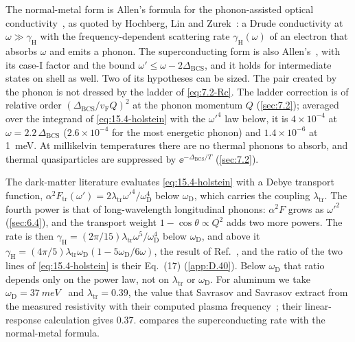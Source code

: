 \noindent The normal-metal form is Allen's formula for the phonon-assisted optical conductivity~\cite{allen1971electron}, as quoted by Hochberg, Lin and Zurek~\cite[Eqs.~(13), (16)]{hochberg2016absorption}: a Drude conductivity at $\omega \gg \gamma_{\mathrm{H}}$ with the frequency-dependent scattering rate $\gamma_{\mathrm{H}}(\omega)$ of an electron that absorbs $\omega$ and emits a phonon. The superconducting form is also Allen's~\cite[Eq.~(17)]{hochberg2016absorption}, with its case-I factor and the bound $\omega' \le \omega - 2\Delta_{\mathrm{BCS}}$, and it holds for intermediate states on shell as well. Two of its hypotheses can be sized. The pair created by the phonon is not dressed by the ladder of \cref{eq:7.2-Rc}. The ladder correction is of relative order $(\Delta_{\mathrm{BCS}}/v_{\mathrm{F}}Q)^2$ at the phonon momentum $Q$ (\cref{sec:7.2}); averaged over the integrand of \cref{eq:15.4-holstein} with the $\omega'^4$ law below, it is $4\times10^{-4}$ at $\omega = 2.2\,\Delta_{\mathrm{BCS}}$ ($2.6\times10^{-4}$ for the most energetic phonon) and $1.4\times10^{-6}$ at \SI{1}{meV}. At millikelvin temperatures there are no thermal phonons to absorb, and thermal quasiparticles are suppressed by $\ee^{-\Delta_{\mathrm{BCS}}/T}$ (\cref{sec:7.2}).

The dark-matter literature evaluates \cref{eq:15.4-holstein} with a Debye transport function, $\alpha^2F_{\mathrm{tr}}(\omega') = 2\lambda_{\mathrm{tr}}\omega'^4/\omega_{\mathrm{D}}^4$ below $\omega_{\mathrm{D}}$, which carries the coupling $\lambda_{\mathrm{tr}}$. The fourth power is that of long-wavelength longitudinal phonons: $\alpha^2F$ grows as $\omega'^2$ (\cref{sec:6.4}), and the transport weight $1 - \cos\theta \propto Q^2$ adds two more powers. The rate is then $\gamma_{\mathrm{H}} = (2\pi/15)\lambda_{\mathrm{tr}}\omega^5/\omega_{\mathrm{D}}^4$ below $\omega_{\mathrm{D}}$, and above it $\gamma_{\mathrm{H}} = (4\pi/5)\lambda_{\mathrm{tr}}\omega_{\mathrm{D}}(1 - 5\omega_{\mathrm{D}}/6\omega)$, the result of Ref.~\cite[Eq.~(16)]{hochberg2016absorption}, and the ratio of the two lines of \cref{eq:15.4-holstein} is their Eq.~(17) (\cref{app:D.40}). Below $\omega_{\mathrm{D}}$ that ratio depends only on the power law, not on $\lambda_{\mathrm{tr}}$ or $\omega_{\mathrm{D}}$. For aluminum we take $\omega_{\mathrm{D}} = \SI{37}{meV}$~\cite{hochberg2016absorption} and $\lambda_{\mathrm{tr}} = 0.39$, the value that Savrasov and Savrasov extract from the measured resistivity with their computed plasma frequency~\cite[Table~IV]{savrasov1996electron}; their linear-response calculation gives 0.37.  compares the superconducting rate with the normal-metal formula.

